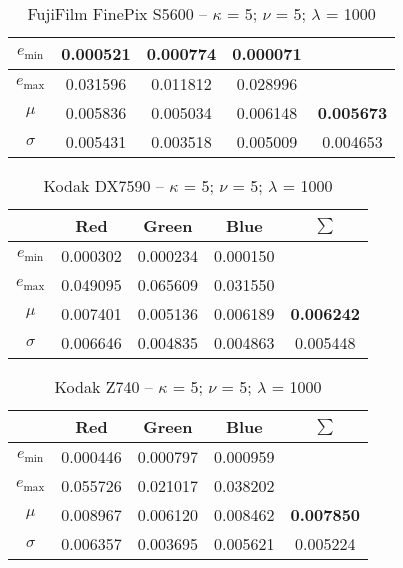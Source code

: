 \begin{appendix}
\begin{table}[htb]
\begin{tabular}{|c||c|c|c|c|}
      $e_\text{min}$ & 0.000521 & 0.000774 & 0.000071 &   \\\hline
      $e_\text{max}$ & 0.031596 & 0.011812 & 0.028996 &   \\\hline
      $\mu$          & 0.005836 & 0.005034 & 0.006148 & \textbf{0.005673} \\\hline
      $\sigma$       & 0.005431 & 0.003518 & 0.005009 & 0.004653 \\\hline
    \end{tabular}
  \caption{FujiFilm FinePix S5600 -- $\kappa$ = 5; $\nu$ = 5; $\lambda$ = 1000}
  \label{tab:FujiFilm FinePix S5600551000}
\end{table}
\begin{table}[htb]
  \centering
    \begin{tabular}{|c||c|c|c|c|}\hline
		   & \textbf{Red} & \textbf{Green} & \textbf{Blue} & \textbf{$\sum$} \\\hline\hline
      $e_\text{min}$ & 0.000302 & 0.000234 & 0.000150 &   \\\hline
      $e_\text{max}$ & 0.049095 & 0.065609 & 0.031550 &   \\\hline
      $\mu$          & 0.007401 & 0.005136 & 0.006189 & \textbf{0.006242} \\\hline
      $\sigma$       & 0.006646 & 0.004835 & 0.004863 & 0.005448 \\\hline
    \end{tabular}
  \caption{Kodak DX7590 -- $\kappa$ = 5; $\nu$ = 5; $\lambda$ = 1000}
  \label{tab:Kodak DX7590551000}
\end{table}
\begin{table}[htb]
  \centering
    \begin{tabular}{|c||c|c|c|c|}\hline
		   & \textbf{Red} & \textbf{Green} & \textbf{Blue} & \textbf{$\sum$} \\\hline\hline
      $e_\text{min}$ & 0.000446 & 0.000797 & 0.000959 &   \\\hline
      $e_\text{max}$ & 0.055726 & 0.021017 & 0.038202 &   \\\hline
      $\mu$          & 0.008967 & 0.006120 & 0.008462 & \textbf{0.007850} \\\hline
      $\sigma$       & 0.006357 & 0.003695 & 0.005621 & 0.005224 \\\hline
    \end{tabular}
  \caption{Kodak Z740 -- $\kappa$ = 5; $\nu$ = 5; $\lambda$ = 1000}
  \label{tab:Kodak Z740551000}
\end{table}
\begin{table}[htb]

\end{table}
\end{appendix}

